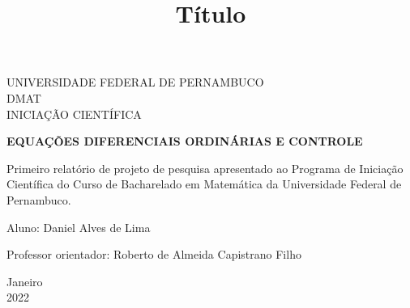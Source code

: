 \documentclass[a4paper, 12pt]{article}
\begin{document}


\begin{titlepage}
	\begin{center}
	

		\Huge{UNIVERSIDADE FEDERAL DE PERNAMBUCO}\\
		\large{DMAT}\\ 
		\large{INICIAÇÃO CIENTÍFICA}\\ 
\vspace{15pt}
        
        \vspace{85pt}
        
		\textbf{\LARGE{EQUAÇÕES DIFERENCIAIS ORDINÁRIAS E CONTROLE}}
		\title{\large{Título}}
			
	\end{center}
\vspace{1,5cm}
	
	\begin{flushright}

   \begin{list}{}{
      \setlength{\leftmargin}{4.5cm}
      \setlength{\rightmargin}{0cm}
      \setlength{\labelwidth}{0pt}
      \setlength{\labelsep}{\leftmargin}}

      \item Primeiro relatório de projeto de pesquisa apresentado ao Programa de Iniciação Científica do Curso de Bacharelado em Matemática da Universidade Federal de Pernambuco.

      \begin{list}{}{
      \setlength{\leftmargin}{0cm}
      \setlength{\rightmargin}{0cm}
      \setlength{\labelwidth}{0pt}
      \setlength{\labelsep}{\leftmargin}}

			\item Aluno: Daniel Alves de Lima\
            \item Professor orientador: Roberto de Almeida Capistrano Filho\

      \end{list}
   \end{list}
\end{flushright}
\vspace{1cm}
\begin{center}
		\vspace{\fill}
		 Janeiro\\
		 2022
			\end{center}
\end{titlepage}
\newpage
\newpage
\tableofcontents
\thispagestyle{empty}
\end{document}
